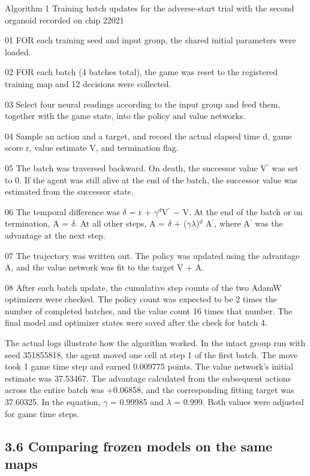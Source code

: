 \documentclass{article}
\begin{document}
Algorithm 1 Training batch updates for the adverse-start trial with the second organoid recorded on chip 22021


01 FOR each training seed and input group, the shared initial parameters were loaded.


02 FOR each batch (4 batches total), the game was reset to the registered training map and 12 decisions were collected.


03 Select four neural readings according to the input group and feed them, together with the game state, into the policy and value networks.


04 Sample an action and a target, and record the actual elapsed time d, game score r, value estimate V, and termination flag.


05 The batch was traversed backward. On death, the successor value V\ensuremath{{}^{\prime}} was set to 0. If the agent was still alive at the end of the batch, the successor value was estimated from the successor state.


06 The temporal difference was \ensuremath{\delta} = r + \ensuremath{\gamma}\ensuremath{{}^{d}}V\ensuremath{{}^{\prime}} \ensuremath{-} V. At the end of the batch or on termination, A = \ensuremath{\delta}. At all other steps, A = \ensuremath{\delta} + (\ensuremath{\gamma}\ensuremath{\lambda})\ensuremath{{}^{d}} A\ensuremath{{}^{\prime}}, where A\ensuremath{{}^{\prime}} was the advantage at the next step.


07 The trajectory was written out. The policy was updated using the advantage A, and the value network was fit to the target V + A.


08 After each batch update, the cumulative step counts of the two AdamW optimizers were checked. The policy count was expected to be 2 times the number of completed batches, and the value count 16 times that number. The final model and optimizer states were saved after the check for batch 4.


The actual logs illustrate how the algorithm worked. In the intact group run with seed 351855818, the agent moved one cell at step 1 of the first batch. The move took 1 game time step and earned 0.009775 points. The value network's initial estimate was 37.53467. The advantage calculated from the subsequent actions across the entire batch was +0.06858, and the corresponding fitting target was 37.60325. In the equation, \ensuremath{\gamma} = 0.99985 and \ensuremath{\lambda} = 0.999. Both values were adjusted for game time steps.


\subsection*{3.6 Comparing frozen models on the same maps}
\end{document}
